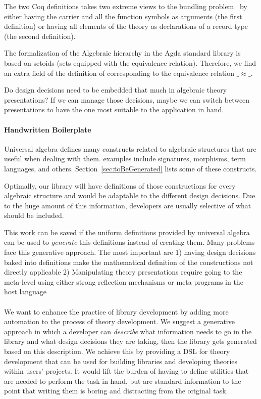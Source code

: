 The two Coq definitions takes two extreme views to the bundling problem~\cite{lean2019,alhassy2019,spitters2011type} by either having the carrier and all the function symbols as arguments (the first definition) or having all elements of the theory as declarations of a record type (the second definition). 

The formalization of the Algebraic hierarchy in the Agda standard library is based on setoids (sets equipped with the equivalence relation). Therefore, we find an extra field of the definition of \monoid corresponding to the equivalence relation $\_\approx\_$. 

Do design decisions need to be embedded that much in algebraic theory presentations? If we can manage those decisions, maybe we can switch between presentations to have the one most suitable to the application in hand.  

\paragraph{Handwritten Boilerplate}
Universal algebra defines many constructs related to algebraic structures that are useful when dealing with them. examples include signatures, morphisms, term languages, and others. Section~\ref{sec:toBeGenerated} lists some of these constructs. 

Optimally, our library will have definitions of those constructions for every algebraic structure and would be adaptable to the different design decisions. Due to the huge amount of this information, developers are usually selective of what should be included. 

This work can be saved if the uniform definitions provided by universal algebra can be used to \emph{generate} this definitions instead of creating them. Many problems face this generative approach. The most important are 1) having design decisions baked into definitions make the mathematical definition of the constructions not directly applicable 2) Manipulating theory presentations require going to the meta-level using either strong reflection mechanisms or meta programs in the host language 

\paragraph{}

We want to enhance the practice of library development by adding more automation to the process of theory development. We suggest a generative approach in which a developer can \emph{describe} what information needs to go in the library and what design decisions they are taking, then the library gets generated based on this description. We achieve this by providing a DSL for theory development that can be used for building libraries and developing theories within users' projects. It would lift the burden of having to define utilities that are needed to perform the task in hand, but are standard information to the point that writing them is boring and distracting from the original task. 

